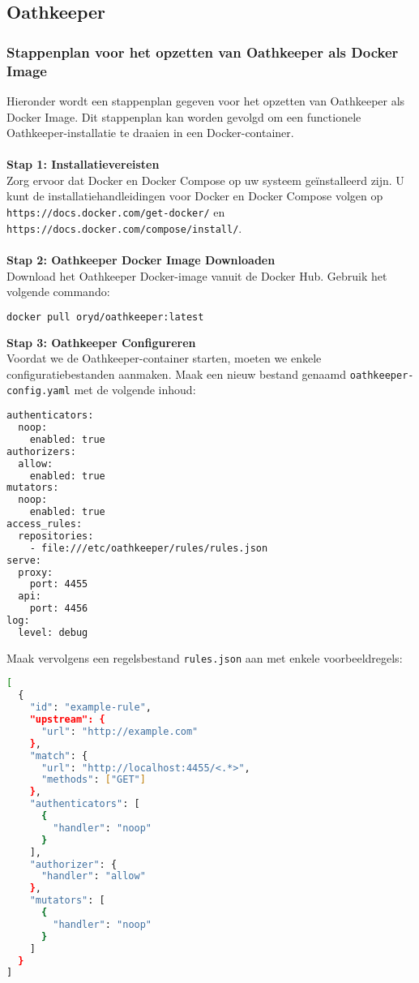 \subsection{Oathkeeper}%
\label{subsec:oathkeeper}
\subsubsection{Stappenplan voor het opzetten van Oathkeeper als Docker Image}%
\label{subsubsec:oathkeeper-setup}
Hieronder wordt een stappenplan gegeven voor het opzetten van Oathkeeper als Docker Image. Dit stappenplan kan worden gevolgd om een functionele Oathkeeper-installatie te draaien in een Docker-container.\\\\
\textbf{Stap 1: Installatievereisten}\\
Zorg ervoor dat Docker en Docker Compose op uw systeem geïnstalleerd zijn. U kunt de installatiehandleidingen voor Docker en Docker Compose volgen op\\ \texttt{https://docs.docker.com/get-docker/} en \texttt{https://docs.docker.com/compose/install/}.\\\\
\textbf{Stap 2: Oathkeeper Docker Image Downloaden}\\
Download het Oathkeeper Docker-image vanuit de Docker Hub. Gebruik het volgende commando:
\begin{lstlisting}[language=bash]
docker pull oryd/oathkeeper:latest
\end{lstlisting}
\textbf{Stap 3: Oathkeeper Configureren}\\
Voordat we de Oathkeeper-container starten, moeten we enkele configuratiebestanden aanmaken. Maak een nieuw bestand genaamd \texttt{oathkeeper-config.yaml} met de volgende inhoud:
\begin{lstlisting}[language=bash]
authenticators:
  noop:
    enabled: true
authorizers:
  allow:
    enabled: true
mutators:
  noop:
    enabled: true
access_rules:
  repositories:
    - file:///etc/oathkeeper/rules/rules.json
serve:
  proxy:
    port: 4455
  api:
    port: 4456
log:
  level: debug
\end{lstlisting}
Maak vervolgens een regelsbestand \texttt{rules.json} aan met enkele voorbeeldregels:
\begin{lstlisting}[language=bash]
[
  {
    "id": "example-rule",
    "upstream": {
      "url": "http://example.com"
    },
    "match": {
      "url": "http://localhost:4455/<.*>",
      "methods": ["GET"]
    },
    "authenticators": [
      {
        "handler": "noop"
      }
    ],
    "authorizer": {
      "handler": "allow"
    },
    "mutators": [
      {
        "handler": "noop"
      }
    ]
  }
]
\end{lstlisting}
